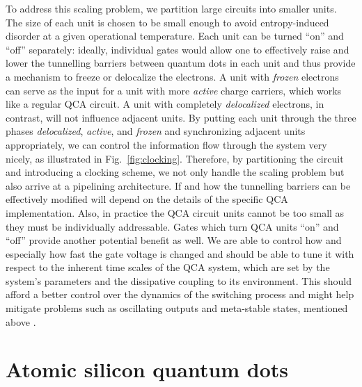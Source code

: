 To address this scaling problem, we partition large circuits into smaller units.
The size of each unit is chosen to be small enough to avoid entropy-induced
disorder at a given operational temperature. Each unit can be turned ``on'' and
``off'' separately: ideally, individual gates would allow one to effectively
raise and lower the tunnelling barriers between quantum dots in each unit and
thus provide a mechanism to freeze or delocalize the electrons. A unit with
\emph{frozen} electrons can serve as the input for a unit with more
\emph{active} charge carriers, which works like a regular QCA circuit. A unit
with completely \emph{delocalized} electrons, in contrast, will not influence
adjacent units. By putting each unit through the three phases
\emph{delocalized}, \emph{active}, and \emph{frozen} and synchronizing adjacent
units appropriately, we can control the information flow through the system very
nicely, as illustrated in Fig.~\ref{fig:clocking}. Therefore, by partitioning
the circuit and introducing a clocking scheme, we not only handle the scaling
problem but also arrive at a pipelining architecture. If and how the
tunnelling barriers can be effectively modified will depend on the details of
the specific QCA implementation. Also, in practice the QCA circuit units cannot
be too small as they must be individually addressable. Gates which turn QCA
units ``on'' and ``off'' provide another potential benefit as well. We are able
to control how and especially how fast the gate voltage is changed and should be
able to tune it with respect to the inherent time scales of the QCA system,
which are set by the system's parameters and the dissipative coupling to its
environment. This should afford a better control over the dynamics of the
switching process and might help mitigate problems such as oscillating outputs
and meta-stable states, mentioned above \cite{lent1997device}.


\section{Atomic silicon quantum dots}
\label{sec:atomic_silicon_quantum_dots}

